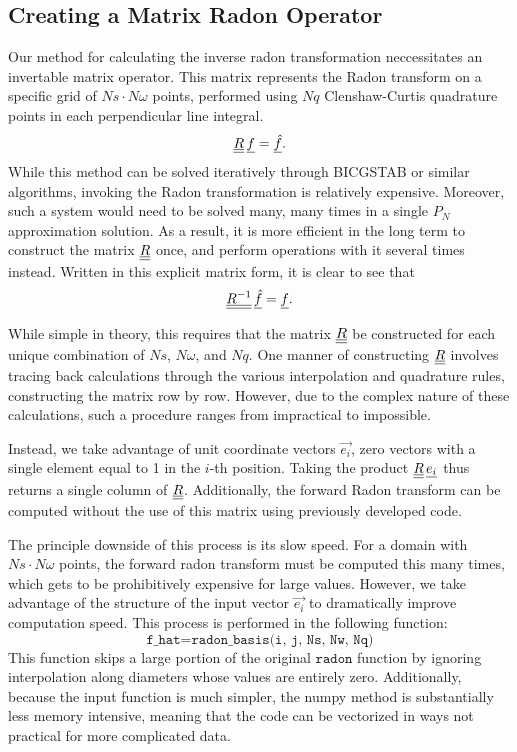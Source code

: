 
\subsection*{Creating a Matrix Radon Operator}

Our method for calculating the inverse radon transformation neccessitates an invertable matrix operator. 
This matrix represents the Radon transform on a specific grid of $Ns \cdot N\omega$ points, performed using $Nq$ Clenshaw-Curtis quadrature points in each perpendicular line integral.
\begin{align*}
	{\underline{\underline{R}}}\,{\underline{f}} = {\underline{\hat{f}}}.
\end{align*}
While this method can be solved iteratively through BICGSTAB or similar algorithms, invoking the Radon transformation is relatively expensive. 
Moreover, such a system would need to be solved many, many times in a single $P_N$ approximation solution.
As a result, it is more efficient in the long term to construct the matrix ${\underline{\underline{R}}}$ once, and perform operations with it several times instead. 
Written in this explicit matrix form, it is clear to see that 
\begin{align*}
	{\underline{\underline{R^{-1}}}}\,{\underline{\hat{f}}} = {\underline{f}}.
\end{align*}

While simple in theory, this requires that the matrix ${\underline{\underline{R}}}$ be constructed for each unique combination of $Ns$, $N\omega$, and $Nq$.
One manner of constructing ${\underline{\underline{R}}}$ involves tracing back  calculations through the various interpolation and quadrature rules, constructing the matrix row by row.
However, due to the complex nature of these calculations, such a procedure ranges from impractical to impossible.

Instead, we take advantage of unit coordinate vectors $\vec{e_i}$, zero vectors with a single element equal to 1 in the $i$-th position.
Taking the product ${\underline{\underline{R}}}\,{\underline{e_i}}$ thus returns a single column of ${\underline{\underline{R}}}$.
Additionally, the forward Radon transform can be computed without the use of this matrix using previously developed code.

The principle downside of this process is its slow speed. For a domain with $Ns\cdot N\omega$ points, the forward radon transform must be computed this many times, which gets to be prohibitively expensive for large values.
However, we take advantage of the structure of the input vector $\vec{e_i}$ to dramatically improve computation speed.
This process is performed in the following function:
$$\texttt{f\_hat} = \texttt{radon\_basis(i, j, Ns, Nw, Nq)}$$
This function skips a large portion of the original $\texttt{radon}$ function by ignoring interpolation along diameters whose values are entirely zero.
Additionally, because the input function is much simpler, the numpy method is substantially less memory intensive, meaning that the code can be vectorized in ways not practical for more complicated data.


